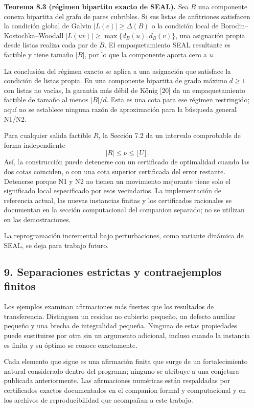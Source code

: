 \documentclass[spanish,11pt,a4paper]{article}
\begin{document}
\textbf{Teorema 8.3 (régimen bipartito exacto de SEAL).} Sea \(B\) una
componente conexa bipartita del grafo de pares cubribles. Si sus listas
de anfitriones satisfacen la condición global de Galvin
\(\lvert L(e)\rvert\ge\Delta(B)\) o la condición local de
Borodin--Kostochka--Woodall
\(\lvert L(uv)\rvert\ge\max\{d_B(u),d_B(v)\}\), una asignación propia
desde listas realiza cada par de \(B\). El empaquetamiento SEAL
resultante es factible y tiene tamaño \(\lvert B\rvert\), por lo que la
componente aporta cero a \(u\).

La conclusión del régimen exacto se aplica a una asignación que
satisface la condición de listas propia. En una componente bipartita de
grado máximo \(d\ge1\) con listas no vacías, la garantía más débil de
Kőnig {[}20{]} da un empaquetamiento factible de tamaño al menos
\(\lvert B\rvert/d\). Esta es una cota para ese régimen restringido;
aquí no se establece ninguna razón de aproximación para la búsqueda
general N1/N2.

Para cualquier salida factible \(R\), la Sección 7.2 da un intervalo
comprobable de forma independiente \[
|R|\le\nu\le\lfloor U\rfloor.
\] Así, la construcción puede detenerse con un certificado de
optimalidad cuando las dos cotas coinciden, o con una cota superior
certificada del error restante. Detenerse porque N1 y N2 no tienen un
movimiento mejorante tiene solo el significado local especificado por
esos vecindarios. La implementación de referencia actual, las nuevas
instancias finitas y los certificados racionales se documentan en la
sección computacional del companion separado; no se utilizan en las
demostraciones.

La reprogramación incremental bajo perturbaciones, como variante
dinámica de SEAL, se deja para trabajo futuro.

\subsection{9. Separaciones estrictas y contraejemplos
finitos}\label{separaciones-estrictas-y-contraejemplos-finitos}

Los ejemplos examinan afirmaciones más fuertes que los resultados de
transferencia. Distinguen un residuo no cubierto pequeño, un defecto
auxiliar pequeño y una brecha de integralidad pequeña. Ninguna de estas
propiedades puede sustituirse por otra sin un argumento adicional,
incluso cuando la instancia es finita y su óptimo se conoce exactamente.

Cada elemento que sigue es una afirmación finita que surge de un
fortalecimiento natural considerado dentro del programa; ninguno se
atribuye a una conjetura publicada anteriormente. Las afirmaciones
numéricas están respaldadas por certificados exactos documentados en el
companion formal y computacional y en los archivos de reproducibilidad
que acompañan a este trabajo.
\end{document}
